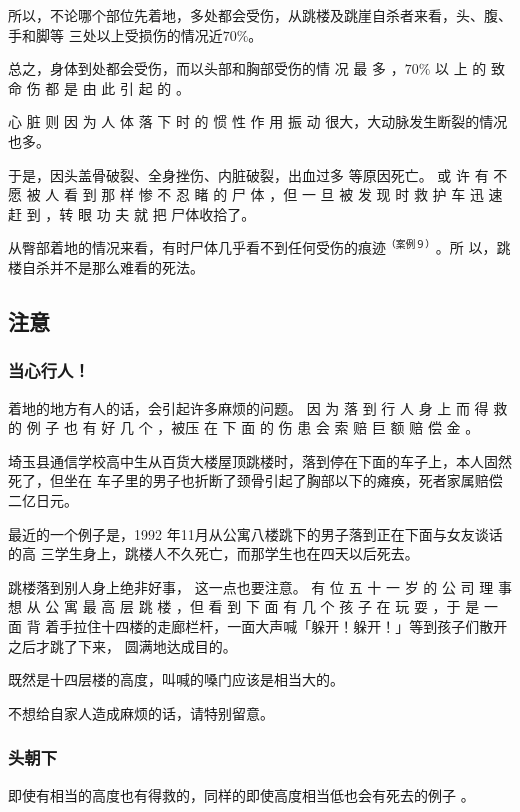 \documentclass[UTF8]{ctexart}
\begin{document}
所以，不论哪个部位先着地，多处都会受伤，从跳楼及跳崖自杀者来看，头、腹、手和脚等 三处以上受损伤的情况近$70\%$。

总之，身体到处都会受伤，而以头部和胸部受伤的情 况 最 多 ，$70\%$ 以 上 的 致 命 伤 都 是 由 此 引 起 的 。

心 脏 则 因 为 人 体 落 下 时 的 惯 性 作 用 振 动 很大，大动脉发生断裂的情况也多。

于是，因头盖骨破裂、全身挫伤、内脏破裂，出血过多 等原因死亡。 
或 许 有 不 愿 被 人 看 到 那 样 惨 不 忍 睹 的 尸 体 ，但 一 旦 被 发 现 时 救 护 车 迅 速 赶 到 ，转 眼 功 夫 就 把 尸体收拾了。

从臀部着地的情况来看，有时尸体几乎看不到任何受伤的痕迹$^{（案例９）}$。所 以，跳楼自杀并不是那么难看的死法。

\subsection{注意}

\subsubsection*{当心行人！}

着地的地方有人的话，会引起许多麻烦的问题。 因 为 落 到 行 人 身 上 而 得 救 的 例 子 也 有 好 几 个 ，被压 在 下 面 的 伤 患 会 索 赔 巨 额 赔 偿 金 。

埼玉县通信学校高中生从百货大楼屋顶跳楼时，落到停在下面的车子上，本人固然死了，但坐在 车子里的男子也折断了颈骨引起了胸部以下的瘫痪，死者家属赔偿二亿日元。

最近的一个例子是，1992 年11月从公寓八楼跳下的男子落到正在下面与女友谈话的高 三学生身上，跳楼人不久死亡，而那学生也在四天以后死去。

跳楼落到别人身上绝非好事， 这一点也要注意。 有 位 五 十 一 岁 的 公 司 理 事 想 从 公 寓 最 高 层 跳 楼 ，但 看 到 下 面 有 几 个 孩 子 在 玩 耍 ，于 是 一 面 背 着手拉住十四楼的走廊栏杆，一面大声喊「躲开！躲开！」等到孩子们散开之后才跳了下来， 圆满地达成目的。

既然是十四层楼的高度，叫喊的嗓门应该是相当大的。

不想给自家人造成麻烦的话，请特别留意。 

\subsubsection*{头朝下}

即使有相当的高度也有得救的，同样的即使高度相当低也会有死去的例子 。
\end{document}
